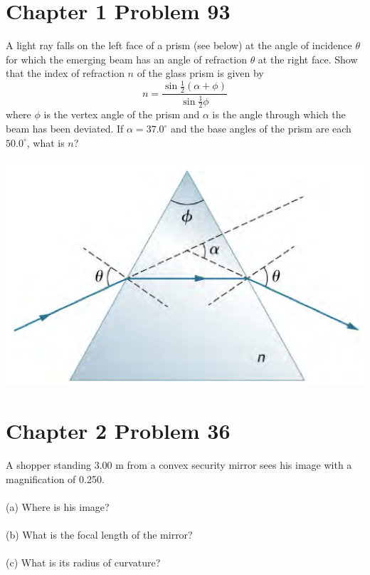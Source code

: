 \documentclass[11pt]{article}
\begin{document}
 \section*{Chapter 1 Problem 93}
 A light ray falls on the left face of a prism (see below) at the angle of incidence \(\theta\) 
 for which the emerging beam has an angle of refraction \(\theta\) at the right face. Show that 
 the index of refraction \(n\) of the glass prism is given by
 \[n = \displaystyle\frac{\sin \frac12 (\alpha + \phi)}{\sin \frac12 \phi}\]
 where \(\phi\) is the vertex angle of the prism and \(\alpha\) is the angle through which the 
 beam has been deviated. If \(\alpha = 37.0^\circ\) and the base angles of the prism are each 
 \(50.0^\circ\), what is \(n\)? \\\\
 \includegraphics[scale=0.3]{1-93.png}
 \newpage

 \section*{Chapter 2 Problem 36}
 A shopper standing 3.00 m from a convex security mirror sees his image with a magnification of 
 0.250. \\\\
 (a) Where is his image? \\\\
 (b) What is the focal length of the mirror? \\\\
 (c) What is its radius of curvature? \\\\
\end{document}
